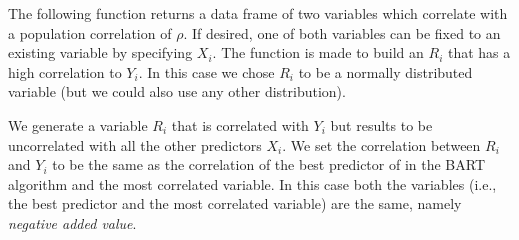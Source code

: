 \documentclass[]{article}
\newenvironment{Shaded}{\begin{snugshade}}{\end{snugshade}}
\newcommand{\CommentTok}[1]{\textcolor[rgb]{0.56,0.35,0.01}{\textit{#1}}}
\newcommand{\ControlFlowTok}[1]{\textcolor[rgb]{0.13,0.29,0.53}{\textbf{#1}}}
\newcommand{\DataTypeTok}[1]{\textcolor[rgb]{0.13,0.29,0.53}{#1}}
\newcommand{\DecValTok}[1]{\textcolor[rgb]{0.00,0.00,0.81}{#1}}
\newcommand{\KeywordTok}[1]{\textcolor[rgb]{0.13,0.29,0.53}{\textbf{#1}}}
\newcommand{\NormalTok}[1]{#1}
\newcommand{\OperatorTok}[1]{\textcolor[rgb]{0.81,0.36,0.00}{\textbf{#1}}}
\newcommand{\OtherTok}[1]{\textcolor[rgb]{0.56,0.35,0.01}{#1}}
\newcommand{\StringTok}[1]{\textcolor[rgb]{0.31,0.60,0.02}{#1}}
\begin{document}
The following function returns a data frame of two variables which
correlate with a population correlation of \(\rho\). If desired, one of
both variables can be fixed to an existing variable by specifying
\(X_i\). The function is made to build an \(R_i\) that has a high
correlation to \(Y_i\). In this case we chose \(R_i\) to be a normally
distributed variable (but we could also use any other distribution).

\par

We generate a variable \(R_i\) that is correlated with \(Y_i\) but
results to be uncorrelated with all the other predictors \(X_i\). We set
the correlation between \(R_i\) and \(Y_i\) to be the same as the
correlation of the best predictor of in the BART algorithm and the most
correlated variable. In this case both the variables (i.e., the best
predictor and the most correlated variable) are the same, namely
\textit{negative added value}.

\begin{Shaded}
\end{Shaded}
\end{document}
